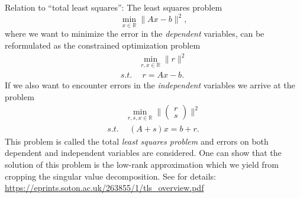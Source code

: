 {%
Relation to ``total least squares'': The least squares problem 
$$
\min \limits_{x\in \mathbb{R}} \| Ax-b \|^2,
$$
where we want to minimize the error in the \textit{dependent} variables,
can be reformulated as the constrained optimization problem 
\begin{align*}
&\min \limits_{r, x\in \mathbb{R}} \| r\|^2 \\
s.t.& ~~
r = Ax-b.
\end{align*}
If we also want to encounter errors in the \textit{independent} variables we arrive at the problem 
\begin{align*}
&\min \limits_{r, s, x\in \mathbb{R}} \| \begin{pmatrix}
r\\s
\end{pmatrix} \|^2 \\
s.t.& ~~
(A + s)x = b + r.
\end{align*}
This problem is called the total \textit{least squares problem} and errors on both dependent and independent variables are considered. One can show that the solution of this problem is the low-rank approximation which we yield from cropping the singular value decomposition. See for details:
\url{https://eprints.soton.ac.uk/263855/1/tls_overview.pdf}
}